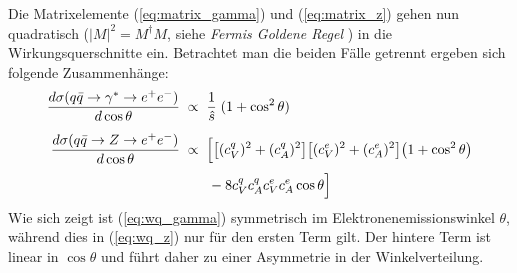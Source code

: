 Die Matrixelemente (\ref{eq:matrix_gamma}) und (\ref{eq:matrix_z}) gehen nun
quadratisch ($|M|^2=M^\dagger M$, siehe \textit{Fermis Goldene Regel}
\cite{Griffiths:2008zz}) in die Wirkungsquerschnitte ein. Betrachtet man die
beiden Fälle getrennt ergeben sich folgende Zusammenhänge:
\begin{align}
    \frac{d\sigma(q\bar q\rightarrow \gamma^* \rightarrow e^+e^-)}{d\cos\theta}
        &\;\propto\; \frac{1}{\hat s}\;(1+\cos^2\theta)
        \label{eq:wq_gamma} \\[5pt]
    \frac{d\sigma(q\bar q\rightarrow Z \rightarrow e^+e^-)}{d\cos\theta}
        &\;\propto\;
            \Bigl[
                \bigl[ (c_V^q)^2 + (c_A^q)^2 \bigr]
                \bigl[ (c_V^e)^2 + (c_A^e)^2 \bigr]
                \bigl( 1 + \cos^2\theta      \bigr)
                \nonumber \\[3pt] & \qquad
                - 8 c_V^q c_A^q c_V^e c_A^e \cos\theta
            \Bigr]
            \label{eq:wq_z}
\end{align}
Wie sich zeigt ist (\ref{eq:wq_gamma}) symmetrisch im Elektronenemissionswinkel
$\theta$, während dies in (\ref{eq:wq_z}) nur für den ersten Term gilt. Der
hintere Term ist linear in $\cos\theta$ und führt daher zu einer Asymmetrie in
der Winkelverteilung.

